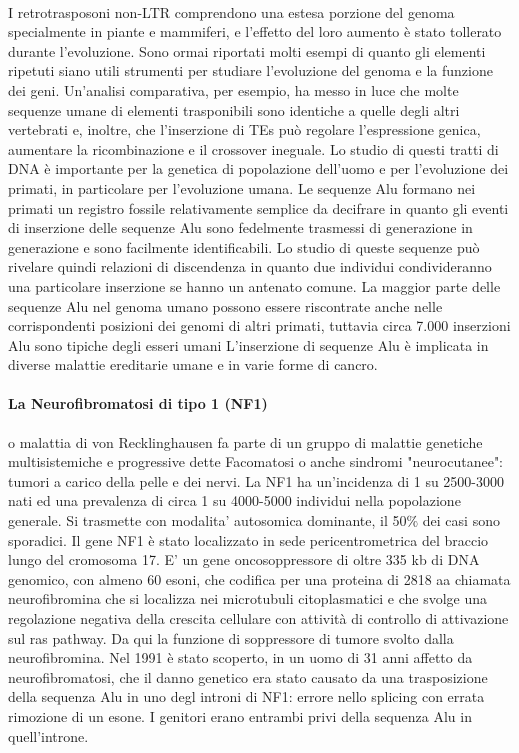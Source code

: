 \documentclass{article}
\begin{document}
\paragraph{}I retrotrasposoni non-LTR comprendono una estesa porzione del genoma
specialmente in piante e mammiferi, e l'effetto del loro aumento è stato
tollerato durante l'evoluzione.
Sono ormai riportati molti esempi di quanto gli elementi ripetuti siano utili
strumenti per studiare l'evoluzione del genoma e la funzione dei geni.
Un'analisi comparativa, per esempio, ha messo in luce che molte sequenze
umane di elementi trasponibili sono identiche a quelle degli altri vertebrati e,
inoltre, che l'inserzione di TEs può regolare l'espressione genica, aumentare la
ricombinazione e il crossover ineguale.
Lo studio di questi tratti di DNA è importante per la genetica di popolazione
dell'uomo e per l'evoluzione dei primati, in particolare per l'evoluzione
umana.
Le sequenze Alu formano nei primati un registro fossile relativamente semplice da
decifrare in quanto gli eventi di inserzione delle sequenze Alu sono fedelmente
trasmessi di generazione in generazione e sono facilmente identificabili. Lo studio
di queste sequenze può rivelare quindi relazioni di discendenza in quanto due
individui condivideranno una particolare inserzione se hanno un antenato
comune. La maggior parte delle sequenze Alu nel genoma umano possono essere
riscontrate anche nelle corrispondenti posizioni dei genomi di altri primati, tuttavia
circa 7.000 inserzioni Alu sono tipiche degli esseri umani L'inserzione di sequenze
Alu è implicata in diverse malattie ereditarie umane e in varie forme di cancro.
\paragraph{La Neurofibromatosi di tipo 1 (NF1)} o malattia di von Recklinghausen fa parte di un gruppo
di malattie genetiche multisistemiche e progressive dette Facomatosi o anche sindromi
"neurocutanee": tumori a carico della pelle e dei nervi. La NF1 ha un'incidenza di 1 su
2500-3000 nati ed una prevalenza di circa 1 su 4000-5000 individui nella popolazione
generale. Si trasmette con modalita' autosomica dominante, il 50$\%$ dei casi sono sporadici. Il
gene NF1 è stato localizzato in sede pericentrometrica del braccio lungo del cromosoma 17.
E' un gene oncosoppressore di oltre 335 kb di DNA genomico, con almeno 60 esoni, che
codifica per una proteina di 2818 aa chiamata neurofibromina che si localizza nei
microtubuli citoplasmatici e che svolge una regolazione negativa della crescita cellulare con
attività di controllo di attivazione sul ras pathway. Da qui la funzione di soppressore di
tumore svolto dalla neurofibromina. Nel 1991 è stato scoperto, in un uomo di 31 anni
affetto da neurofibromatosi, che il danno genetico era stato causato da una trasposizione
della sequenza Alu in uno degl introni di NF1: errore nello splicing con errata rimozione di
un esone. I genitori erano entrambi privi della sequenza Alu in quell'introne.
\end{document}
